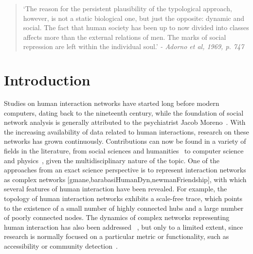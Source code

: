 \documentclass[%
 aip,
 jmp,%
 amsmath,amssymb,
 reprint,%
]{revtex4-1}
\begin{document}
\begin{quotation}
`The reason for the persistent plausibility of the typological approach, however, is not a static biological one, but just the opposite: dynamic and social. The fact that human society has been up to now divided into classes affects more than the external relations of men. The marks of social repression are left within the individual soul.' 
\emph{- Adorno et al, 1969, p. 747}
\end{quotation}


\section{Introduction}\label{sec:into}
Studies on human interaction networks have started long before modern computers, dating back to the nineteenth century, while the foundation of
social network analysis is generally attributed to the psychiatrist Jacob Moreno~\cite{newmanBook}. With the increasing availability of data related to human interactions, research on these networks has grown continuously. Contributions can now be found in a variety of fields in the literature, from social sciences and humanities~\cite{latour2013} to computer science~\cite{bird} and physics~\cite{barabasiHumanDyn,newmanFriendship}, given the multidisciplinary nature of the topic. One of the approaches from an exact science perspective is to represent interaction networks as complex networks [gmane,barabasiHumanDyn,newmanFriendship], with which 
several features of human interaction have been revealed. For example, the topology of human interaction networks exhibits a scale-free trace, which points to the existence of a small number of highly connected hubs and a large number of poorly connected nodes. The dynamics of complex networks representing human interaction has also been addressed ~\cite{barabasiEvo,newmanEvolving}, but only to a limited extent, since research is normally focused on a particular metric or functionality, such as accessibility or community detection~\cite{access,newmanModularity}. 
\end{document}
